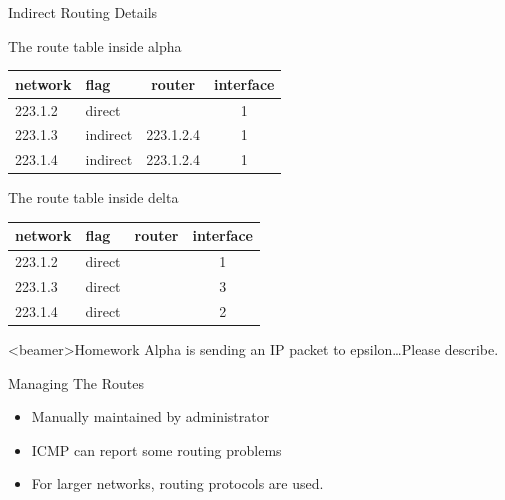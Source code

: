 \begin{frame}{Indirect Routing Details}
  \begin{block}{The route table inside alpha}
    \begin{center}{\ttfamily
      \begin{tabular}{llcc}
        \toprule
        \textrm{network} & \textrm{flag} & \textrm{router} & \textrm{interface}\\\midrule
        223.1.2 & direct & & 1\\
        223.1.3 & indirect & 223.1.2.4 & 1\\
        223.1.4 & indirect & 223.1.2.4 & 1\\\bottomrule
      \end{tabular}}
    \end{center}
  \end{block}

  \begin{block}{The route table inside delta}
    \begin{center}{\ttfamily
      \begin{tabular}{llcc}
        \toprule
        \textrm{network} & \textrm{flag} & \textrm{router} & \textrm{interface} \\\midrule
        223.1.2 & direct & & 1\\
        223.1.3 & direct & & 3\\
        223.1.4 & direct & & 2\\\bottomrule
      \end{tabular}}
    \end{center}
  \end{block}
\end{frame}

\begin{frame}<beamer>{Homework}
  Alpha is sending an IP packet to epsilon\ldots{}Please describe.
\end{frame}

\begin{frame}{Managing The Routes}
  \begin{itemize}
  \item Manually maintained by administrator
  \item ICMP can report some routing problems
  \item For larger networks, routing protocols are used.
  \end{itemize}
\end{frame}

